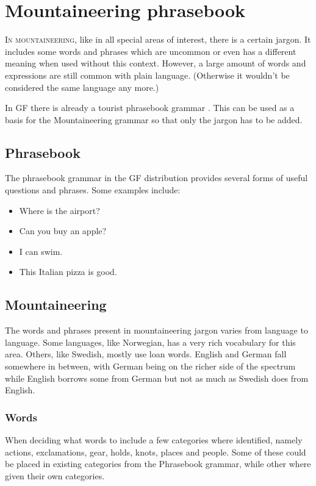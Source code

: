 \chapter{Mountaineering phrasebook}
\lettrine[lines=4, loversize=-0.1, lraise=0.1]{I}{n mountaineering}, like in all special areas of interest, there is a certain jargon. It includes some words and phrases which are uncommon or even has a different meaning when used without this context. However, a large amount of words and expressions are still common with plain language. (Otherwise it wouldn't be considered the same language any more.)

In GF there is already a tourist phrasebook grammar \cite{phrasebook}. This can be used as a basis for the Mountaineering grammar so that only the jargon has to be added.


\section{Phrasebook}
The phrasebook grammar in the GF distribution provides several forms of useful questions and phrases. Some examples include:
\begin{itemize}
\item Where is the airport?
\item Can you buy an apple?
\item I can swim.
\item This Italian pizza is good.
\end{itemize}


\section{Mountaineering}
The words and phrases present in mountaineering jargon varies from language to language. Some languages, like Norwegian, has a very rich vocabulary for this area. Others, like Swedish, mostly use loan words. English and German fall somewhere in between, with German being on the richer side of the spectrum while English borrows some from German but not as much as Swedish does from English.


\subsection{Words}
\label{sec:words}
When deciding what words to include a few categories where identified, namely actions, exclamations, gear, holds, knots, places and people. Some of these could be placed in existing categories from the Phrasebook grammar, while other where given their own categories.


